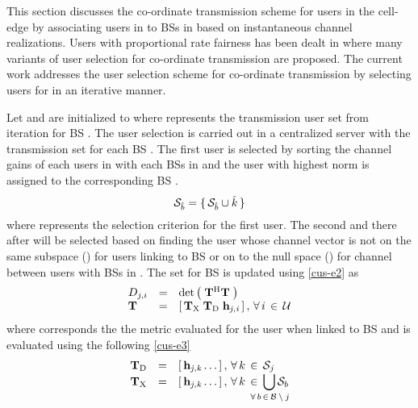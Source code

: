 
This section discusses the co-ordinate transmission scheme for users in the cell-edge by associating users in  to BSs in  based on instantaneous channel realizations. Users with proportional rate fairness has been dealt in \cite{antti_coord_user_selection} where many variants of user selection for co-ordinate transmission are proposed. The current work addresses the user selection scheme for co-ordinate transmission by selecting users for  in an iterative manner.

Let  and  are initialized to  where  represents the transmission user set from  iteration for BS . The user selection is carried out in a centralized server with the transmission set  for each BS . The first user is selected by sorting the channel gains of each users in  with each BSs in  and the user  with highest norm is assigned to the corresponding BS .
\begin{equation}
\mathcal{S}_{\hat{b}} = \lbrace \, \mathcal{S}_{\hat{b}} \cup \hat{k} \, \rbrace
\label{cus-e1}
\end{equation}
where  represents the selection criterion for the first user. The second and there after will be selected based on finding the user whose channel vector is not on the same subspace () for users linking to BS  or on to the null space () for channel between users with BSs in . The set  for BS  is updated using \eqref{cus-e2} as
\begin{equation}
\begin{array}{lcl}
D_{j,i} &=& \det \left ( \; \mathbf{T}^{\mathrm{H}} \mathbf{T} \; \right ) \\
\mathbf{T} &=& \left [ \, \mathbf{T}_{\mathrm{X}} \; \mathbf{T}_{\mathrm{D}} \; \mathbf{h}_{\mathit{j},\mathit{i}} \, \right ], \, \forall \, i \, \in \, \mathcal{U}
\end{array}
\label{cus-e2}
\end{equation}
where  corresponds the the metric evaluated for the user  when linked to BS  and  is evaluated using the following \eqref{cus-e3}
\begin{equation}
\begin{array}{lcl}
\mbf{T}_{\mrm{D}} &=& \matscont{\mvecxyz{h}{j}{k} \dotso}, \fall k \inm \mc{S}_j \\
\mbf{T}_{\mrm{X}} &=& \matscont{\mvecxyz{h}{j}{k} \dotso }, \fall k \inm \displaystyle \bigcup_{\mathclap{\fall b \inm \mc{B} \bs j}} \mc{S}_b
\end{array}
\label{cus-e3}
\end{equation}
